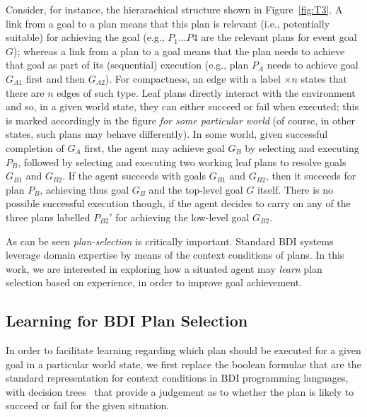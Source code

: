 Consider, for instance, the hierarachical structure shown in Figure~\ref{fig:T3}.
A link from a goal to a plan means that this plan is relevant (i.e., potentially
suitable) for achieving the goal (e.g., $P_1 \ldots P4$ are the relevant plans
for event goal $G$); whereas a link from a plan to a goal means that the plan
needs to achieve that goal as part of its (sequential) execution (e.g., plan
$P_A$ needs to achieve goal $G_{A1}$ first and then $G_{A2}$).
For compactness, an edge with a label $\times n$ states that there are $n$ edges
of such type.
Leaf plans directly interact with the environment and so, in a given world state,
they can either succeed or fail when executed; this is marked accordingly in the
figure \emph{for some particular world} (of course, in other states, such plans
may behave differently).
In some world, given successful completion of $G_A$ first, the agent may achieve
goal $G_B$ by selecting and executing $P_B$, followed by selecting and executing two working leaf plans to resolve goals $G_{B1}$ and $G_{B2}$. If the agent
succeeds with goals $G_{B1}$ and $G_{B2}$, then it succeeds for plan $P_B$,
achieving thus goal $G_B$ and the top-level goal $G$ itself. There is no possible
successful execution though, if the agent decides to carry on any of the three
plans labelled $P_{B2}'$ for achieving the low-level goal $G_{B2}$.


As can be seen \textit{plan-selection} is critically important.
Standard BDI systems leverage domain
expertise by means of the context conditions of plans.
In this work, we are interested in exploring how a situated agent may
\emph{learn} plan selection based on experience, in order to improve goal
achievement. 


\subsection{Learning for BDI Plan Selection} \label{subsec:bdi_learning}
In order to facilitate learning regarding which plan should be
executed for a given goal in a particular world state, we first replace the
boolean formulae that are the standard representation for context
conditions in BDI programming languages, with decision
trees~\cite{Mitchell97:ML} that provide a judgement as to whether the
plan is likely to succeed or fail for the given situation. 


